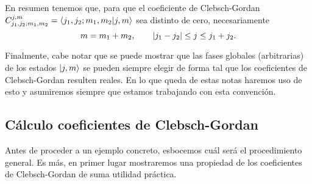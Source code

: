 \documentclass[10pt, a4paper]{article}
\numberwithin{equation}{subsection}
\begin{document}
\bigbreak
{}
\bigbreak

En resumen tenemos que, para que el coeficiente de Clebsch-Gordan
$C_{j_1,j_2;m_1,m_2}^{j,m} = \braket{j_1,j_2;m_1,m_2}{j,m}$ sea distinto de
cero, necesariamente
\begin{equation} \label{eq:selrulesumj}
  m = m_1 + m_2, \qquad \abs{j_1 - j_2} \leq j \leq j_1 + j_2.
\end{equation}

\bigbreak

Finalmente, cabe notar que se puede mostrar que las fases globales
(arbitrarias) de los estados $\ket{j,m}$ se pueden siempre elegir de forma tal
que los coeficientes de Clebsch-Gordan resulten reales. En lo que queda de
estas notas haremos uso de esto y asumiremos siempre que estamos trabajando con
esta convención.

\subsection{Cálculo coeficientes de Clebsch-Gordan}

Antes de proceder a un ejemplo concreto, esbocemos cuál será el procedimiento
general. Es más, en primer lugar mostraremos una propiedad de los coeficientes
de Clebsch-Gordan de suma utilidad práctica.
\end{document}
